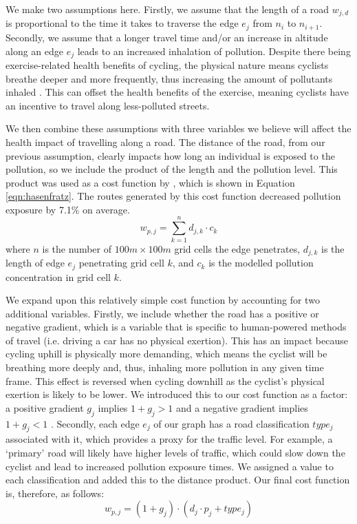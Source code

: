 \documentclass[11pt]{report}
\begin{document}
We make two assumptions here. Firstly, we assume that the length of a road $w_{j, d}$ is proportional to the time it takes to traverse the edge $e_j$ from $n_i$ to $n_{i+1}$. Secondly, we assume that a longer travel time and/or an increase in altitude along an edge $e_j$ leads to an increased inhalation of pollution. Despite there being exercise-related health benefits of cycling, the physical nature means cyclists breathe deeper and more frequently, thus increasing the amount of pollutants inhaled \citep{bigazzi2014reviewintake, Ramos2016inhaleddose}. This can offset the health benefits of the exercise, meaning cyclists have an incentive to travel along less-polluted streets.

We then combine these assumptions with three variables we believe will affect the health impact of travelling along a road. The distance of the road, from our previous assumption, clearly impacts how long an individual is exposed to the pollution, so we include the product of the length and the pollution level. This product was used as a cost function by \cite{Hasenfratz2015highresmapsTram}, which is shown in Equation \ref{eqn:hasenfratz}. The routes generated by this cost function decreased pollution exposure by 7.1\% on average.
\begin{equation} \label{eqn:hasenfratz}
w_{p, j} = \sum_{k=1}^{n} d_{j, k} \cdot c_k
\end{equation}
where $n$ is the number of $100m \times 100m$ grid cells the edge penetrates, $d_{j, k}$ is the length of edge $e_j$ penetrating grid cell $k$, and $c_k$ is the modelled pollution concentration in grid cell $k$.

We expand upon this relatively simple cost function by accounting for two additional variables. Firstly, we include whether the road has a positive or negative gradient, which is a variable that is specific to human-powered methods of travel (i.e. driving a car has no physical exertion). This has an impact because cycling uphill is physically more demanding, which means the cyclist will be breathing more deeply and, thus, inhaling more pollution in any given time frame. This effect is reversed when cycling downhill as the cyclist's physical exertion is likely to be lower. We introduced this to our cost function as a factor: a positive gradient $g_j$ implies $1 + g_j > 1$ and a negative gradient implies $1 + g_j < 1$ . Secondly, each edge $e_j$ of our graph has a road classification $type_j$ associated with it, which provides a proxy for the traffic level. For example, a `primary' road will likely have higher levels of traffic, which could slow down the cyclist and lead to increased pollution exposure times. We assigned a value to each classification and added this to the distance product. Our final cost function is, therefore, as follows:
\begin{equation}
w_{p, j} = (1 + g_j) \cdot (d_j \cdot p_j + type_j)
\end{equation}
\end{document}
